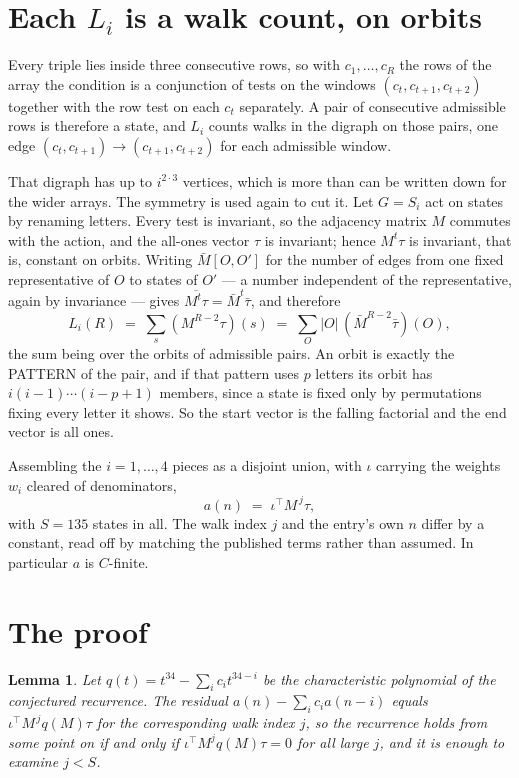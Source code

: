 \documentclass[11pt,a4paper]{article}
\theoremstyle{plain}
\newtheorem{lemma}[theorem]{Lemma}
\theoremstyle{definition}
\begin{document}
\section{Each $L_i$ is a walk count, on orbits}

Every triple lies inside three consecutive rows, so with $c_1,\dots,c_R$ the rows of the array
the condition is a conjunction of tests on the windows $(c_{t},c_{t+1},c_{t+2})$ together
with the row test on each $c_t$ separately. A pair of consecutive admissible rows is therefore
a state, and $L_i$ counts walks in the digraph on those pairs, one edge $(c_t,c_{t+1})\to
(c_{t+1},c_{t+2})$ for each admissible window.

That digraph has up to $i^{2\cdot3}$ vertices, which is more than can be written down for
the wider arrays. The symmetry is used again to cut it. Let $G=S_i$ act on states by renaming
letters. Every test is invariant, so the adjacency matrix $M$ commutes with the action, and the
all-ones vector $\tau$ is invariant; hence $M^{t}\tau$ is invariant, that is, constant on
orbits. Writing $\bar M[O,O']$ for the number of edges from one fixed representative of $O$ to
states of $O'$ --- a number independent of the representative, again by invariance --- gives
$\overline{M^{t}\tau}=\bar M^{t}\bar\tau$, and therefore
\[
L_i(R)\;=\;\sum_{s}(M^{R-2}\tau)(s)\;=\;\sum_{O}|O|\,(\bar M^{R-2}\bar\tau)(O),
\]
the sum being over the orbits of admissible pairs. An orbit is exactly the PATTERN of the pair,
and if that pattern uses $p$ letters its orbit has $i(i-1)\cdots(i-p+1)$ members, since a state
is fixed only by permutations fixing every letter it shows. So the start vector is the falling
factorial and the end vector is all ones.

Assembling the $i=1,\dots,4$ pieces as a disjoint union, with $\iota$ carrying the weights
$w_i$ cleared of denominators,
\[
a(n)\;=\;\iota^{\!\top}M^{\,j}\tau ,
\]
with $S=135$ states in all. The walk index $j$ and the entry's own $n$ differ by a constant,
read off by matching the published terms rather than assumed. In particular $a$ is $C$-finite.

\section{The proof}

\begin{lemma}\label{lem:crit}
Let $q(t)=t^{34}-\sum_i c_it^{34-i}$ be the characteristic polynomial of the
conjectured recurrence. The residual $a(n)-\sum_ic_ia(n-i)$ equals
$\iota^{\!\top}M^{\,j}q(M)\tau$ for the corresponding walk index $j$, so the recurrence
holds from some point on if and only if $\iota^{\!\top}M^{j}q(M)\tau=0$ for all large $j$,
and it is enough to examine $j<S$.
\end{lemma}
\end{document}

